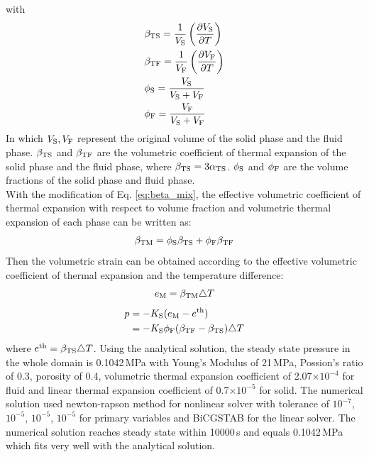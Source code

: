 \documentclass[a4paper,10pt]{article}
\begin{document}
with
\begin{equation}
\begin{split}
& \beta_\mathrm{TS} = \frac{1}{V_\mathrm{S}}\left( \frac{\partial V_\mathrm{S}}{\partial T} \right) \\
& \beta_\mathrm{TF} = \frac{1}{V_\mathrm{F}}\left( \frac{\partial V_\mathrm{F}}{\partial T} \right) \\
& \phi_\mathrm{S} = \frac{V_\mathrm{S}}{V_\mathrm{S} + V_\mathrm{F}} \\
& \phi_\mathrm{F} = \frac{V_\mathrm{F}}{V_\mathrm{S} + V_\mathrm{F}} \\
\end{split}
\end{equation}
In which $V_\mathrm{S}, V_\mathrm{F}$ represent the original volume of the solid phase and the fluid phase. $\beta_\mathrm{TS}$ and $\beta_\mathrm{TF}$ are the volumetric coefficient of thermal expansion of the solid phase and the fluid phase, where $\beta_\mathrm{TS} = 3\alpha_\mathrm{TS}$. $\phi_\mathrm{S}$ and $\phi_\mathrm{F}$ are the volume fractions of the solid phase and fluid phase. \\
With the modification of Eq. \ref{eq:beta_mix}, the effective volumetric coefficient of thermal expansion with respect to volume fraction and volumetric thermal expansion of each phase can be written as:
\begin{equation}
\beta_\mathrm{TM} = \phi_\mathrm{S}\beta_\mathrm{TS} + \phi_\mathrm{F}\beta_\mathrm{TF}
\end{equation}
Then the volumetric strain can be obtained according to the effective volumetric coefficient of thermal expansion and the temperature difference:
\begin{equation}
e_\mathrm{M} = \beta_\mathrm{TM}\triangle T
\end{equation}
\begin{equation}
\label{eq:homo_pressure_analytical}
\begin{split}
p & = -K_\mathrm{S}(e_\mathrm{M} - e^\mathrm{th}) \\
  & = -K_\mathrm{S}\phi_\mathrm{F}(\beta_\mathrm{TF} - \beta_\mathrm{TS})\triangle T
\end{split}
\end{equation}
where $e^\mathrm{th} = \beta_\mathrm{TS}\triangle T$. Using the analytical solution, the steady state pressure in the whole domain is 0.1042\,MPa with Young's Modulus of 21\,MPa, Possion's ratio of 0.3, porosity of 0.4, volumetric thermal expansion coefficient of 2.07$\times10^{-4}$ for fluid and linear thermal expansion coefficient of 0.7$\times10^{-5}$ for solid. The numerical solution used newton-rapson method for nonlinear solver with tolerance of $10^{-7}$, $10^{-5}$, $10^{-5}$, $10^{-5}$ for primary variables and BiCGSTAB for the linear solver. The numerical solution reaches steady state within 10000\,s and equals 0.1042\,MPa which fits very well with the analytical solution. 
\end{document}
